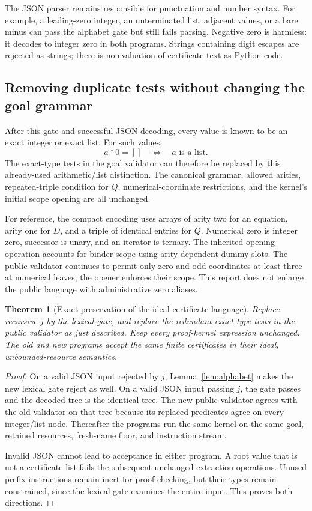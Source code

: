 \documentclass[11pt,a4paper]{article}
\newtheorem{theorem}{Theorem}[section]
\theoremstyle{definition}\newtheorem{definition}[theorem]{Definition}
\begin{document}
The JSON parser remains responsible for punctuation and number syntax.
For example, a leading-zero integer, an unterminated list, adjacent
values, or a bare minus can pass the alphabet gate but still fails
parsing. Negative zero is harmless: it decodes to integer zero in both
programs. Strings containing digit escapes are rejected as strings; there
is no evaluation of certificate text as Python code.

\subsection{Removing duplicate tests without changing the goal grammar}

After this gate and successful JSON decoding, every value is known to be
an exact integer or exact list. For such values,
\[
              a*0=[]\quad\Longleftrightarrow\quad
              a\text{ is a list}.
\]
The exact-type tests in the goal validator can therefore be replaced by
this already-used arithmetic/list distinction. The canonical grammar,
allowed arities, repeated-triple condition for $Q$, numerical-coordinate
restrictions, and the kernel's initial scope opening are all unchanged.

For reference, the compact encoding uses arrays of arity two for an
equation, arity one for $D$, and a triple of identical entries for $Q$.
Numerical zero is integer zero, successor is unary, and an iterator is
ternary. The inherited opening operation accounts for binder scope using
arity-dependent dummy slots. The public validator continues to permit
only zero and odd coordinates at least three at numerical leaves;
the opener enforces their scope. This report does not enlarge the public
language with administrative zero aliases.

\begin{theorem}[Exact preservation of the ideal certificate language]
\label{thm:lexical}
Replace recursive $j$ by the lexical gate, and replace the redundant
exact-type tests in the public validator as just described. Keep every
proof-kernel expression unchanged. The old and new programs accept the
same finite certificates in their ideal, unbounded-resource semantics.
\end{theorem}
\begin{proof}
On a valid JSON input rejected by $j$, Lemma~\ref{lem:alphabet} makes
the new lexical gate reject as well. On a valid JSON input passing $j$,
the gate passes and the decoded tree is the identical tree. The new
public validator agrees with the old validator on that tree because
its replaced predicates agree on every integer/list node. Thereafter
the programs run the same kernel on the same goal, retained resources,
fresh-name floor, and instruction stream.

Invalid JSON cannot lead to acceptance in either program. A root value
that is not a certificate list fails the subsequent unchanged extraction
operations. Unused prefix instructions remain inert for proof checking,
but their types remain constrained, since the lexical gate examines the
entire input. This proves both directions.
\end{proof}
\end{document}
